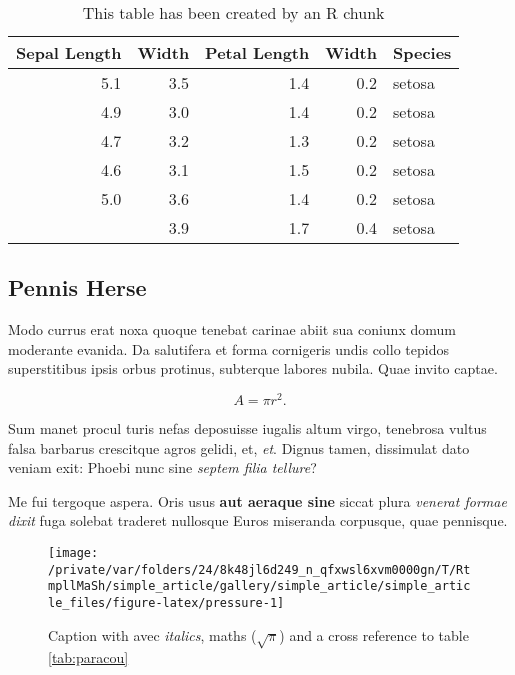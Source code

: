 \documentclass[fleqn,10pt]{article} %
\begin{document}
\scriptsize

\begin{longtable}[t]{rrrrl}
\caption{\label{tab:kable}This table has been created by an R chunk}\\
\toprule
Sepal Length & Width & Petal Length & Width & Species\\
\midrule
5.1 & 3.5 & 1.4 & 0.2 & setosa\\
4.9 & 3.0 & 1.4 & 0.2 & setosa\\
4.7 & 3.2 & 1.3 & 0.2 & setosa\\
4.6 & 3.1 & 1.5 & 0.2 & setosa\\
5.0 & 3.6 & 1.4 & 0.2 & setosa\\
\addlinespace
5.4 & 3.9 & 1.7 & 0.4 & setosa\\
\bottomrule
\end{longtable}

\normalsize

\hypertarget{pennis-herse}{%
\subsection{Pennis Herse}\label{pennis-herse}}

Modo currus erat noxa quoque tenebat carinae abiit sua coniunx domum moderante evanida.
Da salutifera et forma cornigeris undis collo tepidos superstitibus ipsis orbus protinus, subterque labores nubila.
Quae invito captae.

\begin{equation}
  A = \pi r^2.
  \label{eq:disc}
\end{equation}

Sum manet procul turis nefas deposuisse iugalis altum virgo, tenebrosa vultus falsa barbarus crescitque agros gelidi, et, \emph{et}.
Dignus tamen, dissimulat dato veniam exit: Phoebi nunc sine \emph{septem filia tellure}?

Me fui tergoque aspera.
Oris usus \textbf{aut aeraque sine} siccat plura \emph{venerat formae dixit} fuga solebat traderet nullosque Euros miseranda corpusque, quae pennisque.



\scriptsize

\begin{figure}

{\centering \texttt{[image: /private/var/folders/24/8k48jl6d249\_n\_qfxwsl6xvm0000gn/T/RtmpllMaSh/simple\_article/gallery/simple\_article/simple\_article\_files/figure-latex/pressure-1]} 

}

\caption{Caption with avec \emph{italics}, maths (\(\sqrt\pi\)) and a cross reference to table \ref{tab:paracou}}\label{fig:pressure}
\end{figure}
\end{document}
